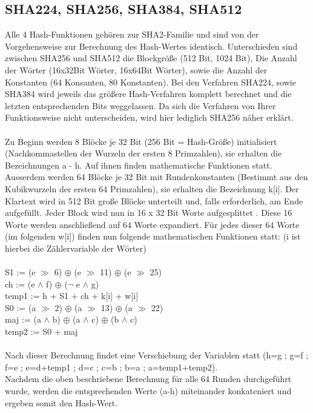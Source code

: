 \documentclass[10pt, a4paper]{scrreprt}
\begin{document}
\subsection{SHA224, SHA256, SHA384, SHA512}
Alle 4 Hash-Funktionen gehören zur SHA2-Familie und sind von der Vorgehensweise zur Berechnung des Hash-Wertes identisch. Unterschieden sind zwischen SHA256 und SHA512 die Blockgröße (512 Bit, 1024 Bit), Die Anzahl der Wörter (16x32Bit Wörter, 16x64Bit Wörter), sowie die Anzahl der Konstanten (64 Konsanten, 80 Konstanten). Bei den Verfahren SHA224, sowie SHA384 wird jeweils das größere Hash-Verfahren komplett berechnet und die letzten entsprechenden Bits weggelassen. Da sich die Verfahren von Ihrer Funktionsweise nicht unterscheiden, wird hier lediglich SHA256 näher erklärt.  \\ \\
Zu Beginn werden 8 Blöcke je 32 Bit (256 Bit = Hash-Größe) initialisiert (Nachkommastellen der Wurzeln der ersten 8 Primzahlen), sie erhalten die Bezeichnungen a - h. Auf ihnen finden mathematische Funktionen statt. Ausserdem werden 64 Blöcke je 32 Bit mit Rundenkonstanten (Bestimmt aus den Kubikwurzeln der ersten 64 Primzahlen), sie erhalten die Bezeichnung k[i].
Der Klartext wird in 512 Bit große Blöcke unterteilt und, falls erforderlich, am Ende aufgefüllt. Jeder Block wird nun in 16 x 32 Bit Worte aufgesplittet . Diese 16 Worte werden anschließend auf 64 Worte expandiert. Für jedes dieser 64 Worte (im folgenden w[i]) finden nun folgende mathematischen Funktionen statt: (i ist hierbei die Zählervariable der Wörter) \\ \\
S1 := (e $\gg$ 6) $\oplus$ (e $\gg$ 11) $\oplus$ (e $\gg$ 25) \\
ch := (e $\land$ f) $\oplus$ ($\lnot$ e $\land$ g) \\
temp1 := h + S1 + ch + k[i] + w[i]\\
S0 := (a $\gg$ 2) $\oplus$ (a $\gg$ 13) $\oplus$ (a $\gg$ 22) \\
maj := (a $\land$ b) $\oplus$ (a $\land$ c) $\oplus$ (b $\land$ c) \\
temp2 := S0 + maj \\ \\
Nach dieser Berechnung findet eine Verschiebung der Variablen statt (h=g ; g=f ; f=e ; e=d+temp1 ; d=c ; c=b ; b=a ; a=temp1+temp2). \\
Nachdem die oben beschriebene Berechnung für alle 64 Runden durchgeführt wurde, werden die entsprechenden Werte (a-h) miteinander konkateniert und ergeben somit den Hash-Wert.
\end{document}
